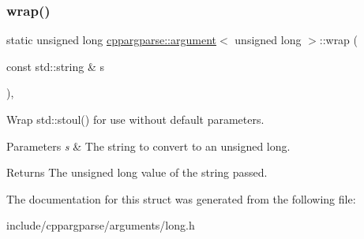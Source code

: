 \subsubsection{\texorpdfstring{wrap()}{wrap()}}
{\footnotesize\ttfamily static unsigned long \hyperlink{structcppargparse_1_1argument}{cppargparse\+::argument}$<$ unsigned long $>$\+::wrap (\begin{DoxyParamCaption}\item[{const std\+::string \&}]{s }\end{DoxyParamCaption})\hspace{0.3cm}{\ttfamily [inline]}, {\ttfamily [static]}}



Wrap std\+::stoul() for use without default parameters. 


\begin{DoxyParams}{Parameters}
{\em s} & The string to convert to an unsigned long.\\
\hline
\end{DoxyParams}
\begin{DoxyReturn}{Returns}
The unsigned long value of the string passed. 
\end{DoxyReturn}


The documentation for this struct was generated from the following file\+:\begin{DoxyCompactItemize}
\item 
include/cppargparse/arguments/long.\+h\end{DoxyCompactItemize}
